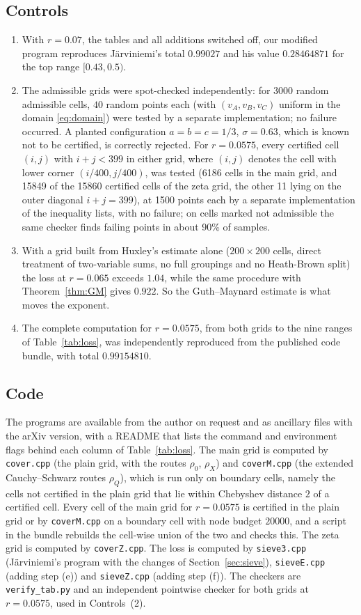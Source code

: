 \documentclass[11pt]{amsart}
\theoremstyle{definition}
\theoremstyle{remark}
\newcommand{\rz}{\RZERO}
\newcommand{\RZERO}{0.0575}
\begin{document}
\subsection*{Controls}
\begin{enumerate}[(1)]
\item With $r=0.07$, the tables and all additions switched off, our modified program reproduces Järviniemi's total $0.99027$ and his value $0.28464871$ for the top range $[0.43,0.5)$.
\item The admissible grids were spot-checked independently: for $3000$ random admissible cells, $40$ random points each (with $(v_A,v_B,v_C)$ uniform in the domain \eqref{eq:domain}) were tested by a separate implementation; no failure occurred. A planted configuration $a=b=c=1/3$, $\sigma=0.63$, which is known not to be certified, is correctly rejected. For $r=\rz$, every certified cell $(i,j)$ with $i+j<399$ in either grid, where $(i,j)$ denotes the cell with lower corner $(i/400,j/400)$, was tested (6186 cells in the main grid, and 15849 of the 15860 certified cells of the zeta grid, the other 11 lying on the outer diagonal $i+j=399$), at 1500 points each by a separate implementation of the inequality lists, with no failure; on cells marked not admissible the same checker finds failing points in about 90\% of samples.
\item With a grid built from Huxley's estimate alone ($200\times200$ cells, direct treatment of two-variable sums, no full groupings and no Heath-Brown split) the loss at $r=0.065$ exceeds $1.04$, while the same procedure with Theorem~\ref{thm:GM} gives $0.922$. So the Guth--Maynard estimate is what moves the exponent.
\item The complete computation for $r=\rz$, from both grids to the nine ranges of Table~\ref{tab:loss}, was independently reproduced from the published code bundle, with total $0.99154810$.
\end{enumerate}

\subsection*{Code}
The programs are available from the author on request and as ancillary files with the arXiv version, with a README that lists the command and environment flags behind each column of Table~\ref{tab:loss}. The main grid is computed by \texttt{cover.cpp} (the plain grid, with the routes $\rho_0$, $\rho_X$) and \texttt{coverM.cpp} (the extended Cauchy--Schwarz routes $\rho_Q$), which is run only on boundary cells, namely the cells not certified in the plain grid that lie within Chebyshev distance $2$ of a certified cell. Every cell of the main grid for $r=\rz$ is certified in the plain grid or by \texttt{coverM.cpp} on a boundary cell with node budget $20000$, and a script in the bundle rebuilds the cell-wise union of the two and checks this. The zeta grid is computed by \texttt{coverZ.cpp}. The loss is computed by \texttt{sieve3.cpp} (Järviniemi's program with the changes of Section~\ref{sec:sieve}), \texttt{sieveE.cpp} (adding step (e)) and \texttt{sieveZ.cpp} (adding step (f)). The checkers are \texttt{verify\_tab.py} and an independent pointwise checker for both grids at $r=\rz$, used in Controls~(2).
\end{document}
